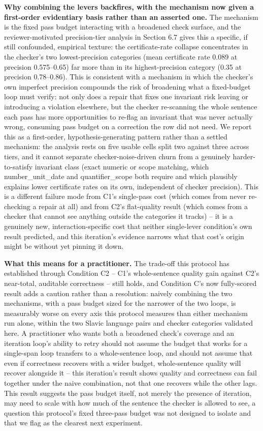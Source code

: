 \documentclass[11pt,letterpaper]{article}
\begin{document}
\textbf{Why combining the levers backfires, with the mechanism now given a first-order evidentiary basis rather than an asserted one.} The mechanism is the fixed pass budget interacting with a broadened check surface, and the reviewer-motivated precision-tier analysis in Section 6.7 gives this a specific, if still confounded, empirical texture: the certificate-rate collapse concentrates in the checker's two lowest-precision categories (mean certificate rate 0.089 at precision 0.575--0.65) far more than in its highest-precision category (0.35 at precision 0.78--0.86). This is consistent with a mechanism in which the checker's own imperfect precision compounds the risk of broadening what a fixed-budget loop must verify: not only does a repair that fixes one invariant risk leaving or introducing a violation elsewhere, but the checker re-scanning the whole sentence each pass has more opportunities to re-flag an invariant that was never actually wrong, consuming pass budget on a correction the row did not need. We report this as a first-order, hypothesis-generating pattern rather than a settled mechanism: the analysis rests on five usable cells split two against three across tiers, and it cannot separate checker-noise-driven churn from a genuinely harder-to-satisfy invariant class (exact numeric or scope matching, which number\_unit\_date and quantifier\_scope both require and which plausibly explains lower certificate rates on its own, independent of checker precision). This is a different failure mode from C1's single-pass cost (which comes from never re-checking a repair at all) and from C2's flat-quality result (which comes from a checker that cannot see anything outside the categories it tracks) -- it is a genuinely new, interaction-specific cost that neither single-lever condition's own result predicted, and this iteration's evidence narrows what that cost's origin might be without yet pinning it down.

\textbf{What this means for a practitioner.} The trade-off this protocol has established through Condition C2 -- C1's whole-sentence quality gain against C2's near-total, auditable correctness -- still holds, and Condition C's now fully-scored result adds a caution rather than a resolution: naively combining the two mechanisms, with a pass budget sized for the narrower of the two loops, is measurably worse on every axis this protocol measures than either mechanism run alone, within the two Slavic language pairs and checker categories validated here. A practitioner who wants both a broadened check's coverage and an iteration loop's ability to retry should not assume the budget that works for a single-span loop transfers to a whole-sentence loop, and should not assume that even if correctness recovers with a wider budget, whole-sentence quality will recover alongside it -- this iteration's result shows quality and correctness can fail together under the naive combination, not that one recovers while the other lags. This result suggests the pass budget itself, not merely the presence of iteration, may need to scale with how much of the sentence the checker is allowed to see, a question this protocol's fixed three-pass budget was not designed to isolate and that we flag as the clearest next experiment.
\end{document}
